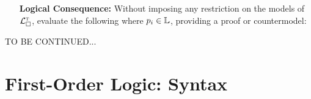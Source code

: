 \documentclass[a4paper, 11pt]{article} %
\begin{document}
\begin{enumerate}[leftmargin=1.2in]
  \item[\bf Logical Consequence:] Without imposing any restriction on the models of $\mathcal{L}^{\textsc{t}}_\square$, evaluate the following where $p_i \in \mathbb{L}$, providing a proof or countermodel:
    \begin{enumerate}[label=\arabic*.,resume]\small
    \end{enumerate}
\end{enumerate}



\pagebreak
\noindent
TO BE CONTINUED...
\pagebreak





\section*{\sc First-Order Logic: Syntax}
\end{document}

